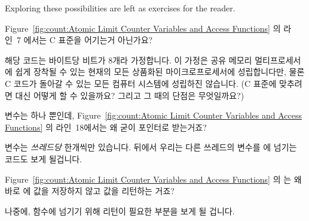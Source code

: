 \begin{enumerate}
	Exploring these possibilities are left as exercises for
	the reader.
	\fi

\QuickQ{}
	Figure~\ref{fig:count:Atomic Limit Counter Variables and Access Functions}
	의 라인~7 에서는 C 표준을 어기는거 아닌가요?

\QuickA{}
	해당 코드는 바이트당 비트가 8개라 가정합니다.
	이 가정은 공유 메모리 멀티프로세서에 쉽게 장착될 수 있는 현재의 모든
	상품화된 마이크로프로세서에 성립합니다만, 물론 C 코드가 돌아갈 수 있는
	모든 컴퓨터 시스템에 성립하진 않습니다.
	(C 표준에 맞추려면 대신 어떻게 할 수 있을까요? 그리고 그 때의 단점은
	무엇일까요?)

\QuickQ{}
	 변수는 하나 뿐인데,
	Figure~\ref{fig:count:Atomic Limit Counter Variables and Access Functions}
	의 라인~18에서는 왜 굳이 포인터로 받는거죠?

\QuickA{}
	 변수는 \emph{쓰레드당} 한개씩만 있습니다.
	뒤에서 우리는 다른 쓰레드의  변수를
	 에 넘기는 코드도 보게 될겁니다.

\QuickQ{}
	Figure~\ref{fig:count:Atomic Limit Counter Variables and Access
	Functions} 의  는 왜 바로  에 값을
	저장하지 않고  값을 리턴하는 거죠?

\QuickA{}
	나중에,  함수에 넘기기 위해  리턴이 필요한
	부분을 보게 될 겁니다.
	\iffalse


\end{enumerate}
